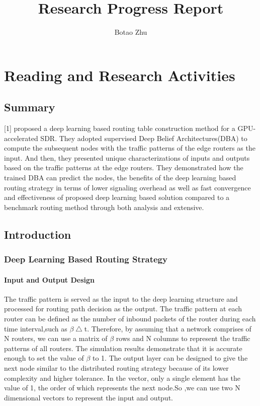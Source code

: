 \documentclass[11pt]{report}
\title{Research Progress Report}
\author{Botao Zhu}
\begin{document}
	
	\maketitle
	
	 \chead{} 
	 \cfoot{} 
	\renewcommand{\footrulewidth}{1.0pt}
	\renewcommand{\headrulewidth}{2.0pt}
	\pagestyle{fancy}
	
	\renewcommand{\thesection}{\arabic{section}}
	
	\section{Reading and Research Activities}
	
	\subsection{Summary}
	[1] proposed a deep learning based routing table construction method for a GPU-accelerated SDR. They adopted supervised Deep Belief Architectures(DBA) to compute the subsequent nodes with the traffic patterns of the edge routers as the input. And then, they presented unique characterizations of inputs and outputs based on the traffic patterns at the edge routers. They demonstrated how the trained DBA can predict the nodes, the benefits of the deep learning based routing strategy in terms of lower signaling overhead as well as fast convergence and effectiveness of proposed deep learning based solution compared to a benchmark routing method through both analysis and extensive.  
	
	\subsection{Introduction}
	\subsubsection{Deep Learning Based Routing Strategy}
    \paragraph{Input and Output Design}
    
    The traffic pattern is served as the input to the deep learning structure and processed for routing path decision as the output. The traffic pattern at each router can be defined as the number of inbound packets of the router during each time interval,such as $\beta\bigtriangleup$t. Therefore, by assuming that a network comprises of N routers, we can use a matrix of $\beta$ rows and N columns to represent the traffic patterns of all routers. The simulation results demonstrate that it is accurate enough to set the value of $\beta$ to 1. The output layer can be designed to give the next node similar to the distributed routing strategy because of its lower complexity and higher tolerance. In the vector, only a single element has the value of 1, the order of which represents the next node.So ,we can use two N dimensional vectors to represent the input and output.
	
\end{document}
